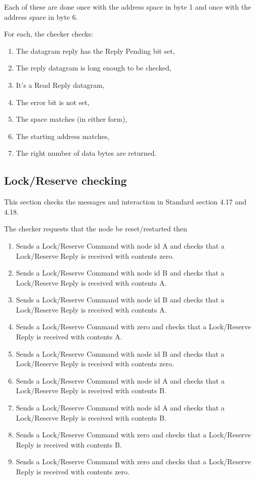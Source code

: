 \documentclass[11pt]{article}
\begin{document}
Each of these are done once with the address space in byte 1 
and once with the address space in byte 6.

For each, the checker checks:
\begin{enumerate}
\item The datagram reply has the Reply Pending bit set,
\item The reply datagram is long enough to be checked,
\item It's a Read Reply datagram,
\item The error bit is not set,
\item The space matches (in either form),
\item The starting address matches,
\item The right number of data bytes are returned.
\end{enumerate}

\subsection{Lock/Reserve checking}

This section checks the messages and interaction in Standard section 4.17 and 4.18.

The checker requests that the node be reset/restarted then 

\begin{enumerate}
\item Sends a Lock/Reserve Command with node id A
    and checks that a Lock/Reserve Reply is received with contents zero.
\item Sends a Lock/Reserve Command with node id B
    and checks that a Lock/Reserve Reply is received with contents A.
\item Sends a Lock/Reserve Command with node id B
    and checks that a Lock/Reserve Reply is received with contents A.
\item Sends a Lock/Reserve Command with zero 
    and checks that a Lock/Reserve Reply is received with contents A.
\item Sends a Lock/Reserve Command with node id B
    and checks that a Lock/Reserve Reply is received with contents zero.
\item Sends a Lock/Reserve Command with node id A
    and checks that a Lock/Reserve Reply is received with contents B.
\item Sends a Lock/Reserve Command with node id A
    and checks that a Lock/Reserve Reply is received with contents B.
\item Sends a Lock/Reserve Command with zero 
    and checks that a Lock/Reserve Reply is received with contents B.
\item Sends a Lock/Reserve Command with zero 
    and checks that a Lock/Reserve Reply is received with contents zero.

\end{enumerate}
\end{document}
